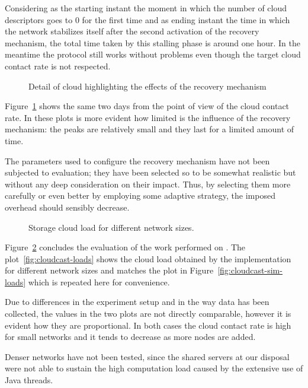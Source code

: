 Considering as the starting instant the moment in which the number of
cloud descriptors goes to $0$ for the first time and as ending
instant the time in which the network stabilizes itself after the
second activation of the recovery mechanism, the total time taken by
this stalling phase is around one hour. In the meantime the protocol
still works without problems even though the target cloud contact
rate is not respected.

\begin{figure}[h!]
  \centering
  \caption{Detail of cloud highlighting the effects of the recovery mechanism}
  \label{fig:cloudcast-dynamic-load-additions-detail}
\end{figure}

Figure~\ref{fig:cloudcast-dynamic-load-additions-detail} shows the
same two days from the point of view of the cloud contact rate. In
these plots is more evident how limited is the influence of the
recovery mechanism: the peaks are relatively small and they last for a
limited amount of time.

The parameters used to configure the recovery mechanism have not been
subjected to evaluation; they have been selected so to be somewhat
realistic but without any deep consideration on their impact. Thus,
by selecting them more carefully or even better by employing some
adaptive strategy, the imposed overhead should sensibly decrease.

\begin{figure}[h!]
  \centering
  \caption{Storage cloud load for different network sizes.}
  \label{fig:cloudcast-loads-global}
\end{figure}

Figure~\ref{fig:cloudcast-loads-global} concludes the evaluation of the
work performed on \grapes. The plot~\ref{fig:cloudcast-loads} shows the cloud
load obtained by the implementation for different network
sizes and matches the plot in Figure~\ref{fig:cloudcast-sim-loads} which
is repeated here for convenience.

Due to differences in the experiment setup and in the way data has been
collected, the values in the two plots are not directly comparable,
however it is evident how they are proportional. In both cases the cloud
contact rate is high for small networks and it tends to decrease as
more nodes are added.

Denser networks have not been tested, since the shared servers at our
disposal were not able to sustain the high computation load caused by
the extensive use of Java threads.
